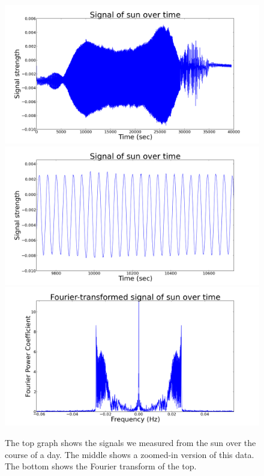 \documentclass[11pt]{article}
\begin{document}
\begin{figure}
\centering
\includegraphics[scale=0.35]{garphs/sundayvolt}
\includegraphics[scale=0.35]{garphs/sundayzoom}
\includegraphics[scale=0.35]{garphs/sundayfourier}
\caption{The top graph shows the signals we measured from the sun over the course of a day. The middle shows a zoomed-in version of this data. The bottom shows the Fourier transform of the top. \label{daysun}}
\end{figure}
\end{document}
